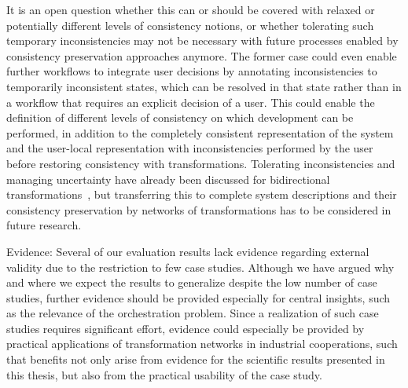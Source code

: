 \begin{properdescription}
It is an open question whether this can or should be covered with relaxed or potentially different levels of consistency notions, or whether tolerating such temporary inconsistencies may not be necessary with future processes enabled by consistency preservation approaches anymore.
The former case could even enable further workflows to integrate user decisions by annotating inconsistencies to temporarily inconsistent states, which can be resolved in that state rather than in a workflow that requires an explicit decision of a user.
This could enable the definition of different levels of consistency on which development can be performed, in addition to the completely consistent representation of the system and the user-local representation with inconsistencies performed by the user before restoring consistency with transformations.
Tolerating inconsistencies and managing uncertainty have already been discussed for bidirectional transformations~\cite{eramo2015uncertainty-SLE,stevens2014Partial-FASE,diskin2016UncertaintyBidirectionalTransformations-BX}, but transferring this to complete system descriptions and their consistency preservation by networks of transformations has to be considered in future research.
\item[Evidence:]
Several of our evaluation results lack evidence regarding external validity due to the restriction to few case studies.
Although we have argued why and where we expect the results to generalize despite the low number of case studies, further evidence should be provided especially for central insights, such as the relevance of the orchestration problem.
Since a realization of such case studies requires significant effort, evidence could especially be provided by practical applications of transformation networks in industrial cooperations, such that benefits not only arise from evidence for the scientific results presented in this thesis, but also from the practical usability of the case study.
\end{properdescription}





